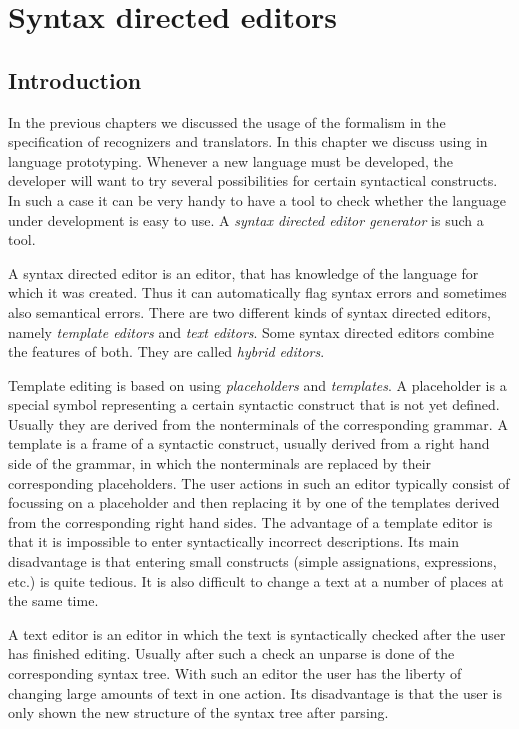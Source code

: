 \chapter {Syntax directed editors}
\section {Introduction}
In the previous chapters we discussed the usage of the \EAG
formalism in the specification of recognizers and translators.
In this chapter we discuss using \EAG in language prototyping.
Whenever a new language must be developed, the developer will
want to try several possibilities for certain syntactical
constructs. In such a case it can be very handy to have a tool
to check whether the language under development is easy to use.
A {\em syntax directed editor generator} is such a tool.

A syntax directed editor is an editor, that has knowledge of
the language for which it was created. Thus it can automatically
flag syntax errors and sometimes also semantical errors. There
are two different kinds of syntax directed editors, namely
{\em template editors} and {\em text editors}. Some syntax directed
editors combine the features of both. They are called {\em hybrid
editors}.

Template editing is based on using {\em placeholders} and {\em templates}.
A placeholder is a special symbol representing a certain
syntactic construct that is not yet defined. Usually they are
derived from the nonterminals of the corresponding grammar. 
A template is a frame of a syntactic construct, usually derived
from a right hand side of the grammar, in which the nonterminals
are replaced by their corresponding placeholders. The user actions
in such an editor typically consist of focussing on a placeholder
and then replacing it by one of the templates derived from the
corresponding right hand sides. The advantage of a template editor
is that it is impossible to enter syntactically incorrect
descriptions. Its main disadvantage is that entering small constructs
(simple assignations, expressions, etc.) is quite tedious. It is
also difficult to change a text at a number of places at the same
time.

A text editor is an editor in which the text is syntactically checked
after the user has finished editing.  Usually after such a check
an unparse is done of the corresponding syntax tree. With such
an editor the user has the liberty of changing large amounts of
text in one action. Its disadvantage is that the user is only shown
the new structure of the syntax tree after parsing.

